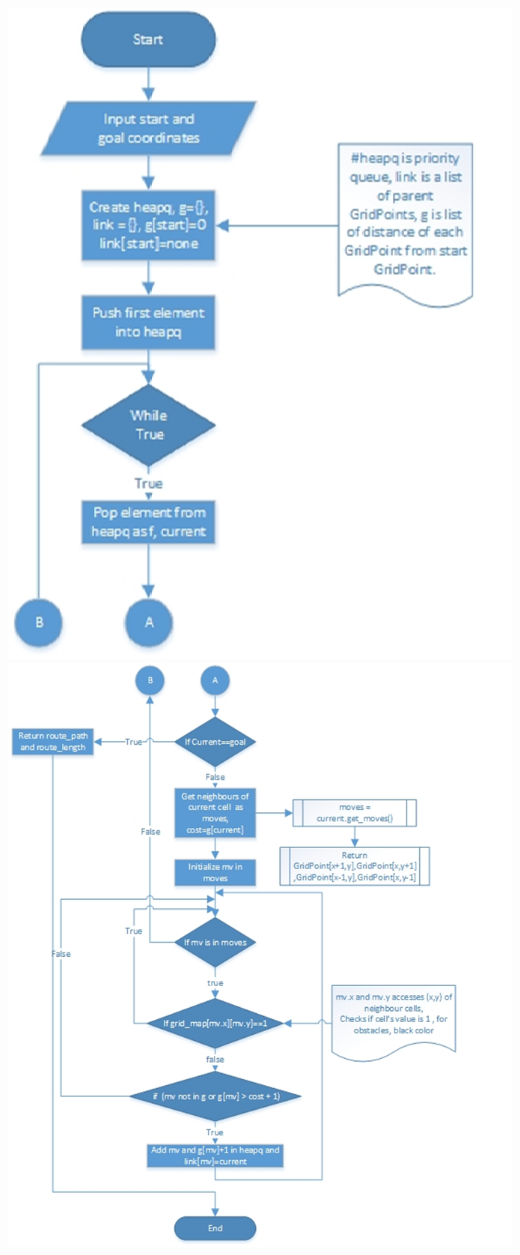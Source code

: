 \documentclass[report]{res}
\begin{document}
	\begin{center}
		\includegraphics[scale = 0.7]{graphics/movement_flow.png}\\
		\includegraphics[scale = 1]{graphics/movement_flow2.jpg}\\
	\end{center}
	
\end{document}

